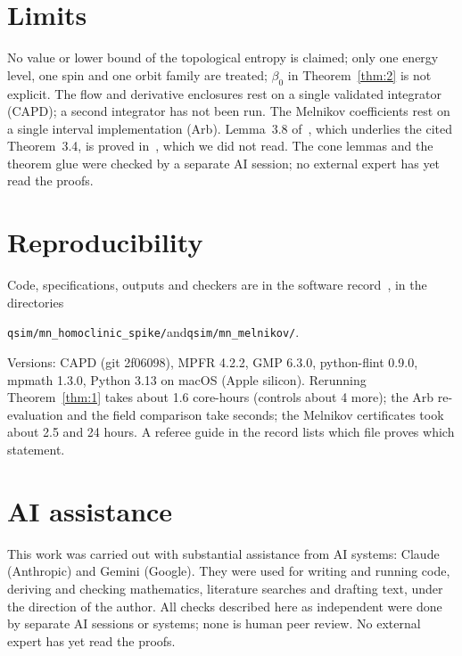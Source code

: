 \documentclass[11pt]{amsart}
\theoremstyle{remark}\newtheorem*{remark}{Remark}
\begin{document}
\section{Limits}
No value or lower bound of the topological entropy is claimed; only one energy level, one spin and one orbit family
are treated; $\beta_0$ in Theorem~\ref{thm:2} is not explicit. The flow and derivative enclosures rest on a single
validated integrator (CAPD); a second integrator has not been run. The Melnikov coefficients rest on a single interval
implementation (Arb). Lemma~3.8 of~\cite{Robinson}, which underlies the cited Theorem~3.4, is proved
in~\cite{RobinsonETDS}, which we did not read. The cone lemmas and the theorem glue were checked by a separate AI
session; no external expert has yet read the proofs.

\section{Reproducibility}
Code, specifications, outputs and checkers are in the software record~\cite{Software}, in the directories
\begin{center}\texttt{qsim/mn\_homoclinic\_spike/}\quad and\quad \texttt{qsim/mn\_melnikov/}.\end{center}
Versions: CAPD (git 2f06098), MPFR 4.2.2,
GMP 6.3.0, python-flint 0.9.0, mpmath 1.3.0, Python 3.13 on macOS (Apple silicon). Rerunning Theorem~\ref{thm:1} takes
about 1.6 core-hours (controls about 4 more); the Arb re-evaluation and the field comparison take seconds; the Melnikov
certificates took about 2.5 and 24 hours. A referee guide in the record lists which file proves which statement.

\section*{AI assistance}
This work was carried out with substantial assistance from AI systems: Claude (Anthropic) and Gemini (Google). They
were used for writing and running code, deriving and checking mathematics, literature searches and drafting text,
under the direction of the author. All checks described here as independent were done by separate AI sessions or
systems; none is human peer review. No external expert has yet read the proofs.
\end{document}
